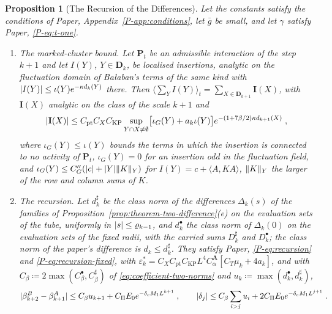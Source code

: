 \documentclass[11pt]{preprint}
\DeclarePairedDelimiter{\abs}{\lvert}{\rvert}
\DeclarePairedDelimiter{\norm}{\lVert}{\rVert}
\numberwithin{equation}{section}
\newtheorem{proposition}{Proposition}
\theoremstyle{definition}
\theoremstyle{remark}
\theoremstyle{plain}
\begin{document}
\begin{proposition}[The Recursion of the Differences]\label{prop:recursion-differences}
Let the constants satisfy the conditions of Paper, Appendix~\ref{P-app:conditions}, let $\bar g$ be small, and let $\gamma$ satisfy Paper, \eqref{P-eq:t-one}.
\begin{enumerate}[label=(\alph*)]
\item \emph{The marked-cluster bound.} Let $\mathbf P_t$ be an admissible interaction of the step $k + 1$ and let $I(Y)$, $Y \in \mathbf D_k$, be localised insertions, analytic on the fluctuation domain of Ba{\l}aban's terms of the same kind with $\abs{I(Y)} \leq \iota(Y)e^{-\kappa d_k(Y)}$ there. Then $\langle\sum_YI(Y)\rangle_t = \sum_{X \in \mathbf D_{k+1}}\mathbf I(X)$, with $\mathbf I(X)$ analytic on the class of the scale $k + 1$ and
\begin{equation}\label{eq:marked-cluster}
    \abs{\mathbf I(X)} \leq C_{\mathrm{pt}}C_XC_{\mathrm{KP}}\sup_{Y \cap X \neq \emptyset}\bigl[\iota_G(Y) + a_k\iota(Y)\bigr]e^{-(1+7\beta/2)\kappa d_{k+1}(X)}\;,
\end{equation}
where $\iota_G(Y) \leq \iota(Y)$ bounds the terms in which the insertion is connected to no activity of $\mathbf P_t$, $\iota_G(Y) = 0$ for an insertion odd in the fluctuation field, and $\iota_G(Y) \leq C''_G(\abs c + \abs Y\norm K_Y)$ for $I(Y) = c + \langle A, KA\rangle$, $\norm K_Y$ the larger of the row and column sums of $K$.
\item \emph{The recursion.} Let $d^\sharp_k$ be the class norm of the differences $\Delta_k(s)$ of the families of Proposition~\ref{prop:theorem-two-difference}(e) on the evaluation sets of the tube, uniformly in $\abs s \leq \varrho_{k-1}$, and $d^\bullet_k$ the class norm of $\Delta_k(0)$ on the evaluation sets of the fixed radii, with the carried sums $D^\sharp_k$ and $D^\bullet_k$; the class norm of the paper's difference is $d_k \leq d^\sharp_k$. They satisfy Paper, \eqref{P-eq:recursion} and \eqref{P-eq:recursion-fixed}, with $\varepsilon^*_k = C_XC_{\mathrm{pt}}C_{\mathrm{KP}}L^4C^{\mathbf A}_\alpha[C_T\mu_k + 4a_k]$, and with $C_\beta \coloneqq 2\max(C^\bullet_\beta, C^\sharp_\beta)$ of \eqref{eq:coefficient-two-norms} and $u_k \coloneqq \max(d^\bullet_k, d^\sharp_k)$,
\begin{equation}\label{eq:coupling-difference-bound}
    \abs{\beta^B_{k+2} - \beta^A_{k+1}} \leq C_\beta u_{k+1} + C_\Pi E_0e^{-\delta_cM_1L^{k+1}}\;,
    \qquad
    \abs{\delta_j} \leq C_\beta\sum_{i>j}u_i + 2C_\Pi E_0e^{-\delta_cM_1L^{j+1}}\;.
\end{equation}

\end{enumerate}
\end{proposition}
\end{document}
